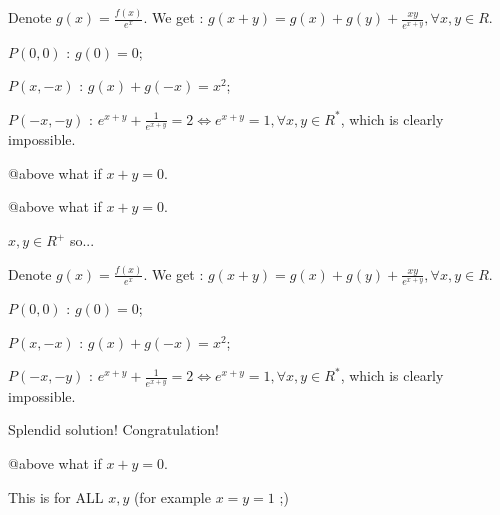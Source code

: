 \begin{solution}
	Denote $g(x)=\frac{f(x)}{e^x}$. We get : $g(x+y)=g(x)+g(y)+\frac{xy}{e^{x+y}}, \forall x,y \in R$.

$P(0,0)$ : $g(0)=0$;

$P(x,-x)$ : $g(x)+g(-x)=x^2$;

$P(-x,-y)$ : $e^{x+y}+\frac{1}{e^{x+y}}=2 \Leftrightarrow e^{x+y}=1, \forall x,y \in R^*$, which is clearly impossible.

\end{solution}



\begin{solution}
	@above what if $x+y=0$.
\end{solution}



\begin{solution}
	\begin{tcolorbox}@above what if $x+y=0$.\end{tcolorbox}
$x,y \in R^+$ so...

\end{solution}



\begin{solution}
	\begin{tcolorbox}Denote $g(x)=\frac{f(x)}{e^x}$. We get : $g(x+y)=g(x)+g(y)+\frac{xy}{e^{x+y}}, \forall x,y \in R$.

$P(0,0)$ : $g(0)=0$;

$P(x,-x)$ : $g(x)+g(-x)=x^2$;

$P(-x,-y)$ : $e^{x+y}+\frac{1}{e^{x+y}}=2 \Leftrightarrow e^{x+y}=1, \forall x,y \in R^*$, which is clearly impossible.\end{tcolorbox}

Splendid solution! Congratulation!
\end{solution}



\begin{solution}
	\begin{tcolorbox}@above what if $x+y=0$.\end{tcolorbox}

This is for ALL $x,y$ (for example $x=y=1$  ;) 
\end{solution}



